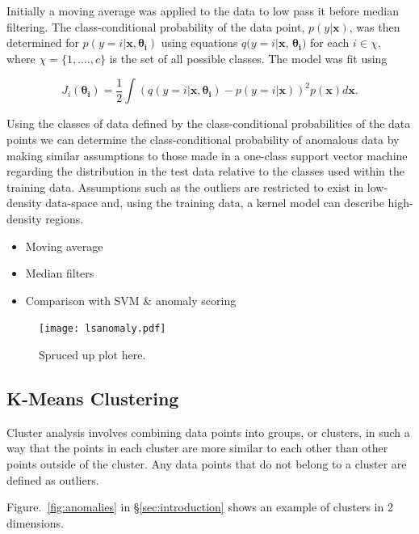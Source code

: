 Initially a moving average was applied to the data to low pass it before median filtering. The class-conditional probability of the data point,  $p(y|\mathbf{x})$, was then determined for $p(y=i|\mathbf{x}, \mathbf{\theta_i})$ using equations $q(y=i|\mathbf{x}$, $\mathbf{\theta_i})$ for each $i \in \chi$, where $\chi = \{1, ...., c\}$ is the set of all possible classes. The model was fit using

\begin{equation}
    J_i(\mathbf{\theta_i})=\dfrac{1}{2}\int(q(y=i|\mathbf{x},\mathbf{\theta_i}) - p(y=i|\mathbf{x}))^2p(\mathbf{x})d\mathbf{x}.
\end{equation}

Using the classes of data defined by the class-conditional probabilities of the data points we can determine the class-conditional probability of anomalous data by making similar assumptions to those made in a one-class support vector machine regarding the distribution in the test data relative to the classes used within the training data. Assumptions such as the outliers are restricted to exist in low-density data-space and, using the training data, a kernel model can describe high-density regions.


\begin{itemize}
\item Moving average
\item Median filters
\item Comparison with SVM \& anomaly scoring
\end{itemize}

\begin{figure}[t]
    \texttt{[image: lsanomaly.pdf]}
    \caption[Least Squares Anomaly Score]{Spruced up plot here.}
    \label{fig:lsanomaly}
\end{figure}

\subsection{K-Means Clustering}
\label{subsec:kmeans}

Cluster analysis involves combining data points into groups, or clusters, in such a way that the points in each cluster are more similar to each other than other points outside of the cluster. Any data points that do not belong to a cluster are defined as outliers. 

Figure.~\ref{fig:anomalies} in \S \ref{sec:introduction} shows an example of clusters in 2 dimensions. 

